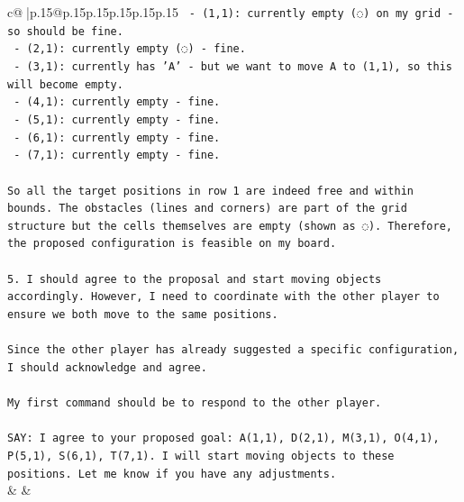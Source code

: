 \documentclass{article}
\begin{document}
{\begin{supertabular}{c@{$\;$}|p{.15\linewidth}@{}p{.15\linewidth}p{.15\linewidth}p{.15\linewidth}p{.15\linewidth}p{.15\linewidth}}
{{{\texttt{   {-} (1,1): currently empty (◌) on my grid {-} so should be fine.} \\
\texttt{   {-} (2,1): currently empty (◌) {-} fine.} \\
\texttt{   {-} (3,1): currently has 'A' {-} but we want to move A to (1,1), so this will become empty.} \\
\texttt{   {-} (4,1): currently empty {-} fine.} \\
\texttt{   {-} (5,1): currently empty {-} fine.} \\
\texttt{   {-} (6,1): currently empty {-} fine.} \\
\texttt{   {-} (7,1): currently empty {-} fine.} \\
\\ 
\texttt{So all the target positions in row 1 are indeed free and within bounds. The obstacles (lines and corners) are part of the grid structure but the cells themselves are empty (shown as ◌). Therefore, the proposed configuration is feasible on my board.} \\
\\ 
\texttt{5. I should agree to the proposal and start moving objects accordingly. However, I need to coordinate with the other player to ensure we both move to the same positions.} \\
\\ 
\texttt{Since the other player has already suggested a specific configuration, I should acknowledge and agree.} \\
\\ 
\texttt{My first command should be to respond to the other player.} \\
\\ 
\texttt{SAY: I agree to your proposed goal: A(1,1), D(2,1), M(3,1), O(4,1), P(5,1), S(6,1), T(7,1). I will start moving objects to these positions. Let me know if you have any adjustments.} \\
            }
        }
    }
    & & \\ \\


\end{supertabular}}
\end{document}
